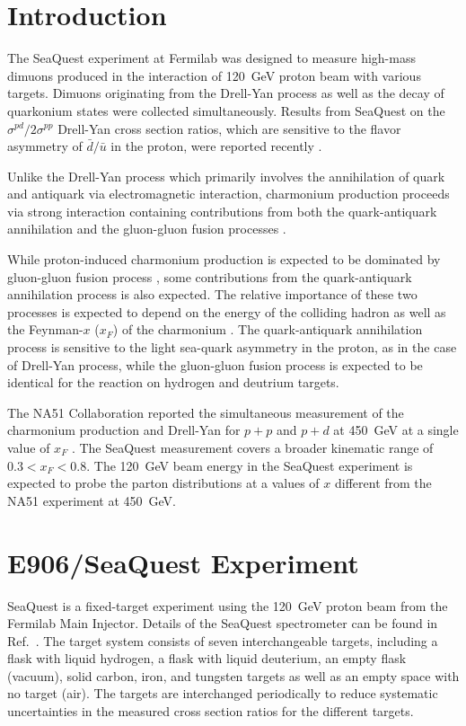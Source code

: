 \documentclass[10pt,a4paper,final]{article}
\begin{document}
\section{Introduction}
\label{sec:intro}
The SeaQuest experiment at Fermilab was designed to measure high-mass dimuons
produced in the interaction of \SI{120}{\GeV} proton beam with various targets.
Dimuons originating from the Drell-Yan process \cite{drell1970} as well as the
decay of quarkonium states were collected simultaneously. Results from SeaQuest
on the $\sigma^{pd}/2\sigma^{pp}$ Drell-Yan cross section ratios, which are sensitive to
the flavor asymmetry of $\bar{d}/\bar{u}$ in the proton, were reported recently
\cite{dove2021}.

Unlike the Drell-Yan process which primarily involves the annihilation of quark
and antiquark via electromagnetic interaction, charmonium production proceeds
via strong interaction containing contributions from both the quark-antiquark
annihilation and the gluon-gluon fusion processes \cite{vogt1999}.

While proton-induced charmonium production is expected to be dominated by gluon-gluon
fusion process \cite{vogt1999}, some contributions from the quark-antiquark
annihilation process is also expected. The relative importance of these two
processes is expected to depend on the energy of the colliding hadron as well
as the Feynman-$x$ ($x_F$) of the charmonium \cite{peng1995}. The quark-antiquark
annihilation process is sensitive to the light sea-quark asymmetry in the proton,
as in the case of Drell-Yan process, while the gluon-gluon fusion process is expected
to be identical for the reaction on hydrogen and deutrium targets.

The NA51 Collaboration reported the simultaneous measurement of the charmonium
production and Drell-Yan for $p+p$ and $p+d$ at \SI{450}{\GeV} at a single value
of $x_F$ \cite{abreu1998}. The SeaQuest measurement covers a broader kinematic
range of $0.3<x_F<0.8$. The \SI{120}{\GeV} beam energy in the SeaQuest experiment
is expected to probe the parton distributions at a values of $x$ different from the
NA51 experiment at \SI{450}{\GeV}.


\section{E906/SeaQuest Experiment}
\label{sec:e906}
SeaQuest is a fixed-target experiment using the \SI{120}{\GeV} proton beam
from the Fermilab Main Injector. Details of the SeaQuest spectrometer can be
found in Ref.~\cite{aidala2019}. The target system consists of seven
interchangeable targets, including a flask with liquid hydrogen, a flask with
liquid deuterium, an empty flask (vacuum), solid carbon, iron, and tungsten
targets as well as an empty space with no target (air). The targets are interchanged
periodically to reduce systematic uncertainties in the measured cross section
ratios for the different targets.
\end{document}
